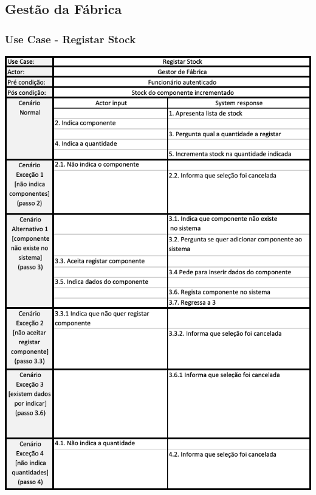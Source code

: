 \subsection{Gestão da Fábrica}
\subsubsection{Use Case - Registar Stock}
\begin{center}
 	\includegraphics[width = 5.5in]{D_E_USECASE/uc_registar_stock.png}
\end{center}
